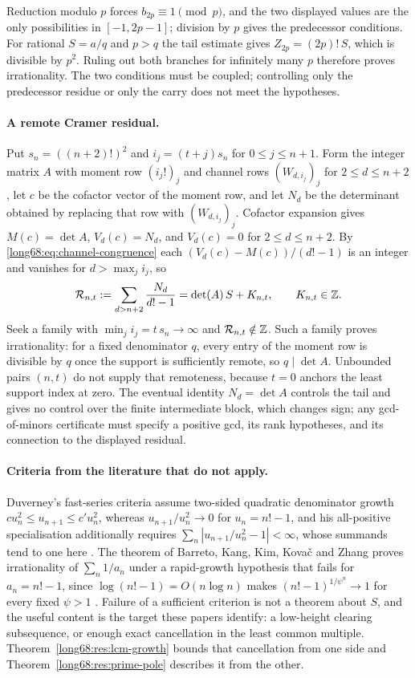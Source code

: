 \documentclass[11pt]{article}
\newcommand{\Ser}{S}
\newcommand{\chn}[2]{V_{#1}(#2)}
\begin{document}
Reduction modulo $p$ forces $b_{2p}\equiv1\pmod p$, and the two displayed
values are the only possibilities in $[-1,2p-1]$; division by $p$ gives the
predecessor conditions.  For rational $\Ser=a/q$ and $p>q$ the tail estimate
gives $Z_{2p}=(2p)!\,\Ser$, which is divisible by $p^2$.  Ruling out both
branches for infinitely many $p$ therefore proves irrationality.  The two
conditions must be coupled; controlling only the predecessor residue or only
the carry does not meet the hypotheses.

\paragraph{A remote Cramer residual.}
Put $s_n=((n+2)!)^2$ and $i_j=(t+j)s_n$ for $0\le j\le n+1$.  Form the
integer matrix $A$ with moment row $(i_j!)_j$ and channel rows
$(W_{d,i_j})_j$ for $2\le d\le n+2$, let $c$ be the cofactor vector of the
moment row, and let $N_d$ be the determinant obtained by replacing that row
with $(W_{d,i_j})_j$.  Cofactor expansion gives $M(c)=\det A$,
$\chn dc=N_d$, and $\chn dc=0$ for $2\le d\le n+2$.  By
\eqref{long68:eq:channel-congruence} each $(\chn dc-M(c))/(d!-1)$ is an integer and
vanishes for $d>\max_ji_j$, so
\[
 \mathcal R_{n,t}:=\sum_{d>n+2}\frac{N_d}{d!-1}
 =\det(A)\,\Ser+K_{n,t},\qquad K_{n,t}\in\Z .
\]
Seek a family with $\min_ji_j=t\,s_n\to\infty$ and
$\mathcal R_{n,t}\notin\mathbb{Z}$.  Such a family proves irrationality: for a fixed
denominator $q$, every entry of the moment row is divisible by $q$ once the
support is sufficiently remote, so $q\mid\det A$.  Unbounded pairs $(n,t)$ do
not supply that remoteness, because $t=0$ anchors the least support index at
zero.  The eventual identity $N_d=\det A$ controls the tail and gives no
control over the finite intermediate block, which changes sign; any
gcd-of-minors certificate must specify a positive gcd, its rank hypotheses,
and its connection to the displayed residual.

\paragraph{Criteria from the literature that do not apply.}
Duverney's fast-series criteria assume two-sided quadratic denominator growth
$cu_n^2\le u_{n+1}\le c'u_n^2$, whereas $u_{n+1}/u_n^2\to0$ for
$u_n=n!-1$, and his all-positive specialisation additionally requires
$\sum_n|u_{n+1}/u_n^2-1|<\infty$, whose summands tend to one here
\cite[pp.~275, 285--287]{duverney}.  The theorem of Barreto, Kang, Kim,
Kova\v{c} and Zhang proves irrationality of $\sum_n1/a_n$ under a
rapid-growth hypothesis that fails for $a_n=n!-1$, since
$\log(n!-1)=O(n\log n)$ makes $(n!-1)^{1/\psi^n}\to1$ for every fixed
$\psi>1$ \cite[Thms.~2--3 and Rem.~4]{barreto-et-al}.  Failure of a
sufficient criterion is not a theorem about $\Ser$, and the useful content is
the target these papers identify: a low-height clearing subsequence, or
enough exact cancellation in the least common multiple.
Theorem~\ref{long68:res:lcm-growth} bounds that cancellation from one side and
Theorem~\ref{long68:res:prime-pole} describes it from the other.
\end{document}
